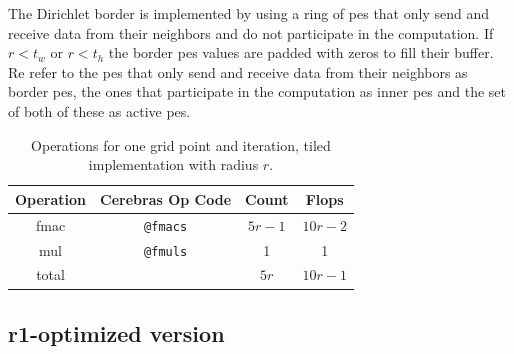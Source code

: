 The Dirichlet border is implemented by using a ring of \acp{pe} that only send and receive data from their neighbors and do not participate in the computation. If $r<t_w$ or $r<t_h$ the border \acp{pe} values are padded with zeros to fill their buffer. Re refer to the \acp{pe} that only send and receive data from their neighbors as border \acp{pe}, the ones that participate in the computation as inner \acp{pe} and the set of both of these as active \acp{pe}.

\begin{table}[h]
    \centering
    \caption{Operations for one grid point and iteration, tiled implementation with radius $r$.}
    \label{tab:tiled_operations}
    \begin{tabular}{@{}cccc@{}}
        \toprule
        Operation & Cerebras Op Code & Count & Flops \\
        \midrule
        fmac & \texttt{@fmacs} & $5r-1$ & $10r-2$ \\
        mul & \texttt{@fmuls} & \num{1} & \num{1} \\
        \midrule
        total & & $5r$ & $10r-1$ \\
        \bottomrule
    \end{tabular}
\end{table}

\subsection{r1-optimized version}

